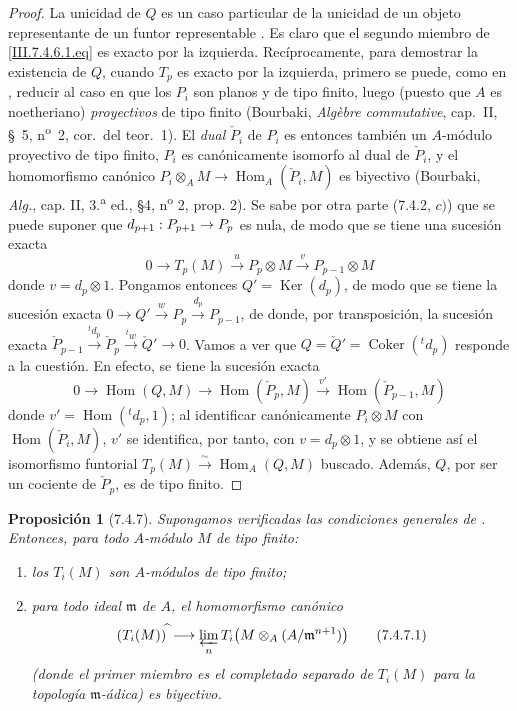 \documentclass[10pt,oneside,openany]{book}
\theoremstyle{egaenv}\newtheorem*{env}{---}
\theoremstyle{egastatement}
\newtheorem*{proposition}{Proposición}
\theoremstyle{egadescription}
\newcommand{\oldpage}[2][]{\marginnote{\normalfont\scriptsize\textbf{#1}\,|\,#2}\ignorespaces}
\renewcommand{\to}{\mathchoice{\longrightarrow}{\rightarrow}{\rightarrow}{\rightarrow}}
\begin{document}
\begin{proof}
La unicidad de $Q$ es un caso particular de la unicidad de un objeto
representante de un funtor representable . Es claro que el
segundo miembro de \eqref{III.7.4.6.1.eq} es exacto por la izquierda.
Recíprocamente, para demostrar la existencia de $Q$, cuando $T_p$ es exacto
por la izquierda, primero se puede, como en , reducir al caso
en que los $P_i$ son planos y de tipo finito, luego (puesto que $A$ es
noetheriano) \emph{proyectivos} de tipo finito (Bourbaki,
\emph{Algèbre commutative}, cap.~II, \S~5, n\textsuperscript{o}~2, cor.~del
teor.~1). El \emph{dual} $\check P_i$ de $P_i$ es entonces también un $A$-módulo
proyectivo de tipo finito, $P_i$ es canónicamente isomorfo al dual de
$\check P_i$, y el homomorfismo canónico
$P_i\otimes_A M\longrightarrow\operatorname{Hom}_A(\check P_i,M)$
es biyectivo (Bourbaki, \emph{Alg.}, cap. II, 3.\textsuperscript{a} ed.,
\S 4, n\textsuperscript{o} 2, prop. 2). Se sabe por otra parte (7.4.2, $c)$)
que se puede suponer que $d_{p+1}:P_{p+1}\to P_p$ es nula, de modo que se tiene una sucesión exacta
\[
  0\longrightarrow T_p(M)\xrightarrow{u}P_p\otimes M
  \xrightarrow{v}P_{p-1}\otimes M
\]
donde $v=d_p\otimes1$. Pongamos entonces $Q'=\operatorname{Ker}(d_p)$, de modo que se tiene
la sucesión exacta
$0\longrightarrow Q'\xrightarrow{w}P_p\xrightarrow{d_p}P_{p-1}$,
de donde, por transposición, la sucesión exacta
$\check P_{p-1}\xrightarrow{{}^t d_p}\check P_p
\xrightarrow{{}^t w}\check Q'\longrightarrow0$.
Vamos a ver que
$Q=\check Q'=\operatorname{Coker}({}^t d_p)$
responde a la cuestión. En efecto, se tiene la sucesión exacta
\[
  0\longrightarrow\operatorname{Hom}(Q,M)
  \longrightarrow\operatorname{Hom}(\check P_p,M)
  \xrightarrow{v'}\operatorname{Hom}(\check P_{p-1},M)
\]
\oldpage[III]{189}
donde $v'=\operatorname{Hom}({}^t d_p,1)$; al identificar canónicamente
$P_i\otimes M$ con $\operatorname{Hom}(\check P_i,M)$, $v'$ se identifica, por tanto, con
$v=d_p\otimes1$, y se obtiene así el isomorfismo funtorial
$T_p(M)\xrightarrow{\sim}\operatorname{Hom}_A(Q,M)$
buscado. Además, $Q$, por ser un cociente de $\check P_p$, es de tipo finito.
\end{proof}

\begin{proposition}[7.4.7]
\label{III.7.4.7}
Supongamos verificadas las condiciones generales de . Entonces,
para todo $A$-módulo $M$ de tipo finito:
\begin{enumerate}
  \item[\textup{(i)}] los $T_i(M)$ son $A$-módulos de tipo finito;
  \item[\textup{(ii)}] para todo ideal $\mathfrak m$ de $A$, el homomorfismo canónico
    \[
      (T_i(M))^{\widehat{\,}}
      \longrightarrow
      \varprojlim_n T_i\bigl(M\otimes_A(A/\mathfrak m^{n+1})\bigr)
      \tag{7.4.7.1}\label{III.7.4.7.1.fr}
    \]
    (donde el primer miembro es el completado separado de $T_i(M)$ para la
    topología $\mathfrak m$-ádica) es biyectivo.
\end{enumerate}
\end{proposition}
\end{document}
